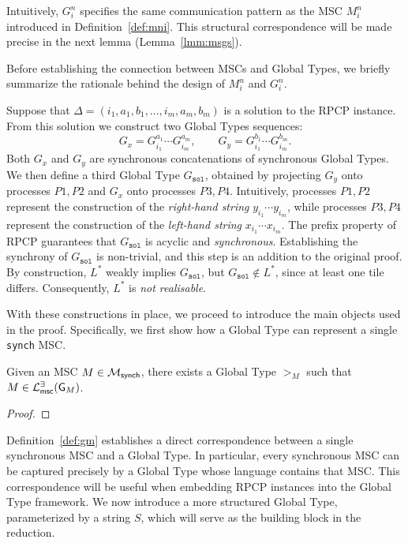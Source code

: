 Intuitively, $G_i^n$ specifies the same communication pattern as the MSC  
$M^n_i$ introduced in Definition~\ref{def:mni}. This structural  
correspondence will be made precise in the next lemma (Lemma~\ref{lmm:msgs}).  

Before establishing the connection between MSCs and Global Types,
we briefly summarize the rationale behind the design of $M_i^n$ and $G_i^n$.

Suppose that $\Delta=(i_1,a_1,b_1,\ldots,i_m,a_m,b_m)$ is a  
solution to the RPCP instance. From this solution we construct   
two Global Types sequences:
\[
G_x = G^{a_1}_{i_1}\cdots G^{a_m}_{i_m}, \qquad  
G_y = G^{b_1}_{i_1}\cdots G^{b_m}_{i_m}.
\]
Both $G_x$ and $G_y$ are synchronous concatenations of synchronous  
Global Types. We then define a third Global Type $G_{\texttt{sol}}$, obtained by  
projecting $G_y$ onto processes $P1,P2$ and $G_x$ onto processes  
$P3,P4$. Intuitively, processes $P1,P2$ represent the construction of  
the \emph{right-hand string} $y_{i_1}\cdots y_{i_m}$, while processes  
$P3,P4$ represent the construction of the \emph{left-hand string}  
$x_{i_1}\cdots x_{i_m}$. The prefix property of RPCP guarantees that  
$G_{\texttt{sol}}$ is acyclic and \emph{synchronous}. Establishing the  
synchrony of $G_{\texttt{sol}}$ is non-trivial, and this step is an  
addition to the original proof. By construction, $L^*$ weakly implies  
$G_{\texttt{sol}}$, but $G_{\texttt{sol}} \notin L^*$, since at least  
one tile differs. Consequently, $L^*$ is \emph{not realisable}.
  
With these constructions in place, we proceed to introduce the main  
objects used in the proof. Specifically, we first show how a Global  
Type can represent a single \verb|synch| MSC.

\bigskip

\begin{lemma}[$G_M$]\label{def:gm}
Given an MSC $M\in \mathcal{M}_{\mathsf{synch}}$, there exists a
Global Type $\gt_M$ such that $M \in \mathcal{L}_{\mathsf{msc}}^{\exists}(\mathsf{G}_M)$.
\end{lemma}

\begin{proof}
\end{proof}

Definition~\ref{def:gm} establishes a direct correspondence between a  
single synchronous MSC and a Global Type. In particular, every  
synchronous MSC can be captured precisely by a Global Type whose  
language contains that MSC. This correspondence will be useful  
when embedding RPCP instances into the Global Type framework.
We now introduce a more structured Global Type, parameterized by a  
string $S$, which will serve as the building block in the reduction.

